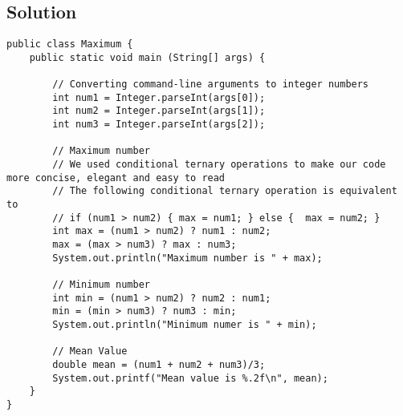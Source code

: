 \subsection*{Solution}
\lstset{language=Java}
\begin{lstlisting}
public class Maximum {
	public static void main (String[] args) {

		// Converting command-line arguments to integer numbers
		int num1 = Integer.parseInt(args[0]);
		int num2 = Integer.parseInt(args[1]);
		int num3 = Integer.parseInt(args[2]);

		// Maximum number
		// We used conditional ternary operations to make our code more concise, elegant and easy to read
		// The following conditional ternary operation is equivalent to
		// if (num1 > num2) { max = num1; } else {	max = num2; }
		int max = (num1 > num2) ? num1 : num2;
		max = (max > num3) ? max : num3;
		System.out.println("Maximum number is " + max);

		// Minimum number
		int min = (num1 > num2) ? num2 : num1;
		min = (min > num3) ? num3 : min;
		System.out.println("Minimum numer is " + min);

		// Mean Value
		double mean = (num1 + num2 + num3)/3;
		System.out.printf("Mean value is %.2f\n", mean);
	}
}
\end{lstlisting}
